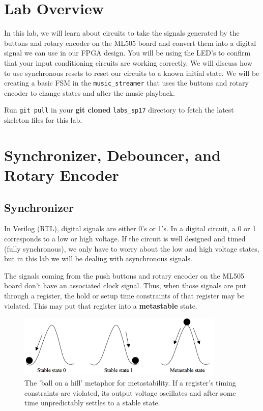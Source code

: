 \documentclass[11pt]{article}
\begin{document}
\section{Lab Overview}

In this lab, we will learn about circuits to take the signals generated by the buttons and rotary encoder on the ML505 board and convert them into a digital signal we can use in our FPGA design. You will be using the LED's to confirm that your input conditioning circuits are working correctly. We will discuss how to use synchronous resets to reset our circuits to a known initial state. We will be creating a basic FSM in the \verb|music_streamer| that uses the buttons and rotary encoder to change states and alter the music playback.

Run \verb|git pull| in your \textbf{git cloned} \verb|labs_sp17| directory to fetch the latest skeleton files for this lab.

\section{Synchronizer, Debouncer, and Rotary Encoder}



\subsection{Synchronizer}
In Verilog (RTL), digital signals are either 0's or 1's. In a digital circuit, a 0 or 1 corresponds to a low or high voltage. If the circuit is well designed and timed (fully synchronous), we only have to worry about the low and high voltage states, but in this lab we will be dealing with asynchronous signals.

The signals coming from the push buttons and rotary encoder on the ML505 board don't have an associated clock signal. Thus, when those signals are put through a register, the hold or setup time constraints of that register may be violated. This may put that register into a \textbf{metastable} state.

\begin{figure}[H]
	\centerline{\includegraphics[height=3cm]{images/lab2_fig3.png}}
	\caption{The 'ball on a hill' metaphor for metastability. If a register's timing constraints are violated, its output voltage oscillates and after some time unpredictably settles to a stable state.}
\end{figure}
\end{document}
